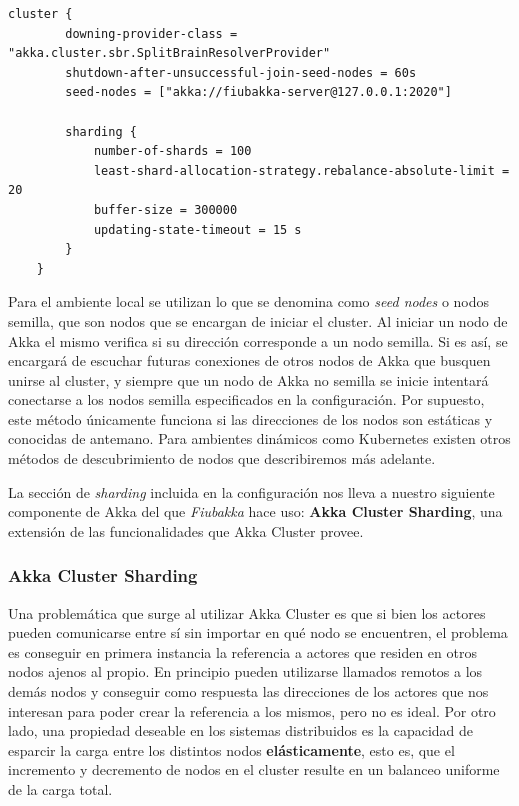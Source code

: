 \label{config:akka-cluster}
\begin{lstlisting}[language=applicationconf, caption={\textbf{Configuración de Akka Cluster Fiubakka}}]
    cluster {
        downing-provider-class = "akka.cluster.sbr.SplitBrainResolverProvider"
        shutdown-after-unsuccessful-join-seed-nodes = 60s
        seed-nodes = ["akka://fiubakka-server@127.0.0.1:2020"]

        sharding {
            number-of-shards = 100
            least-shard-allocation-strategy.rebalance-absolute-limit = 20
            buffer-size = 300000
            updating-state-timeout = 15 s
        }
    }
\end{lstlisting}

Para el ambiente local se utilizan lo que se denomina como \textit{seed nodes} o nodos semilla, que son nodos que se encargan de iniciar el cluster.
Al iniciar un nodo de Akka el mismo verifica si su dirección corresponde a un nodo semilla. Si es así, se encargará de escuchar futuras
conexiones de otros nodos de Akka que busquen unirse al cluster, y siempre que un nodo de Akka no semilla se inicie intentará conectarse a los nodos semilla especificados
en la configuración. Por supuesto, este método únicamente funciona si las direcciones de los nodos son estáticas y conocidas de antemano.
Para ambientes dinámicos como Kubernetes existen otros métodos de descubrimiento de nodos que describiremos más adelante.

La sección de \textit{sharding} incluida en la configuración nos lleva a nuestro siguiente componente de Akka del que \textit{Fiubakka}
hace uso: \textbf{Akka Cluster Sharding}, una extensión de las funcionalidades que Akka Cluster provee.

\subsubsection{Akka Cluster Sharding}

\noindent Una problemática que surge al utilizar Akka Cluster es que si bien los actores pueden comunicarse entre sí sin importar en qué nodo
se encuentren, el problema es conseguir en primera instancia la referencia a actores que residen en otros nodos ajenos al propio. En principio
pueden utilizarse llamados remotos a los demás nodos y conseguir como respuesta las direcciones de los actores que nos interesan para poder
crear la referencia a los mismos, pero no es ideal. Por otro lado, una propiedad deseable en los sistemas distribuidos es la capacidad
de esparcir la carga entre los distintos nodos \textbf{elásticamente}, esto es, que el incremento y decremento de nodos en el cluster
resulte en un balanceo uniforme de la carga total.

